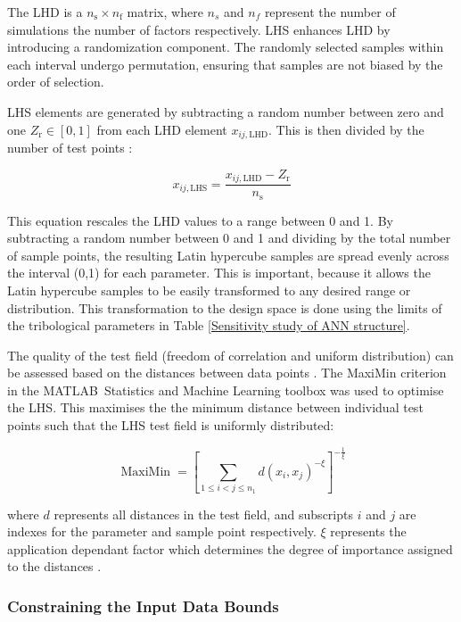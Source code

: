 The LHD is a $n_{\mathrm{s}} \times n_{\mathrm{f}}$ matrix, where $n_s$ and $n_f$ represent the number of simulations the number of factors respectively. LHS enhances LHD by introducing a randomization component. The randomly selected samples within each interval undergo permutation, ensuring that samples are not biased by the order of selection.

LHS elements are generated by subtracting a random number between zero and one $Z_{\mathrm{r}}\in[0,1]$ from each LHD element $x_{i j, \mathrm{LHD}}$. This is then divided by the number of test points \cite{Siebertz2010}:

\begin{equation}\label{LHS}
	x_{i j, \mathrm{LHS}}=\frac{x_{i j, \mathrm{LHD}}-Z_{\mathrm{r}}}{n_{\mathrm{s}}}
\end{equation}

This equation rescales the LHD values to a range between 0 and 1. By subtracting a random number between 0 and 1 and dividing by the total number of sample points, the resulting Latin hypercube samples are spread evenly across the interval (0,1) for each parameter. This is important, because it allows the Latin hypercube samples to be easily transformed to any desired range or distribution. This transformation to the design space is done using the limits of the tribological parameters in Table \ref{Sensitivity study of ANN structure}.

The quality of the test field (freedom of correlation and uniform distribution) can be assessed based on the distances between data points \cite{Johnson1990}. The MaxiMin criterion in the MATLAB\textregistered\ Statistics and Machine Learning toolbox was used to optimise the LHS. This maximises the the minimum distance between individual test points such that the LHS test field is uniformly distributed:

\begin{equation}\label{maximin}
	\operatorname{MaxiMin}=\left[\sum_{1 \leq i<j \leq n_1} d\left(x_i, x_j\right)^{-\xi}\right]^{-\frac{1}{\xi}}
\end{equation}

where $d$ represents all distances in the test field, and subscripts $i$ and $j$ are indexes for the parameter and sample point respectively. $\xi$ represents the application dependant factor which determines the degree of importance assigned to the distances \cite{Siebertz2010}.

\subsubsection{Constraining the Input Data Bounds}

